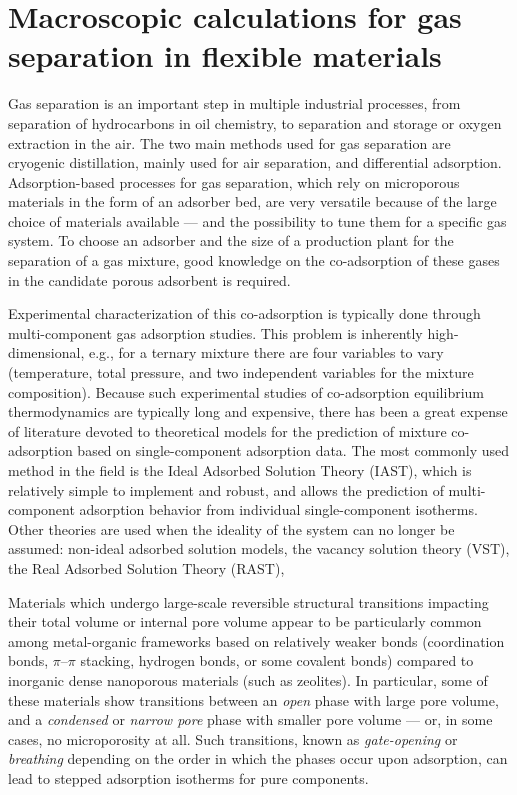\documentclass[thesis]{subfiles}
\begin{document}
\newpage
\section{Macroscopic calculations for gas separation in flexible materials}

Gas separation is an important step in multiple industrial processes, from
separation of hydrocarbons in oil chemistry, to  separation and storage
or oxygen extraction in the air. The two main methods used for gas separation
are cryogenic distillation, mainly used for air separation, and differential
adsorption. Adsorption-based processes for gas separation, which rely on
microporous materials in the form of an adsorber bed, are very versatile because
of the large choice of materials available --- and the possibility to tune them
for a specific gas system. To choose an adsorber and the size of a production
plant for the separation of a gas mixture, good knowledge on the co-adsorption
of these gases in the candidate porous adsorbent is required.

Experimental characterization of this co-adsorption is typically done through
multi-component gas adsorption studies. This problem is inherently
high-dimensional, e.g., for a ternary mixture there are four variables to vary
(temperature, total pressure, and two independent variables for the mixture
composition). Because such experimental studies of co-adsorption equilibrium
thermodynamics are typically long and expensive, there has been a great expense
of literature devoted to theoretical models for the prediction of mixture
co-adsorption based on single-component adsorption data. The most commonly used
method in the field is the Ideal Adsorbed Solution Theory
(IAST)\cite{Myers1965}, which is relatively simple to implement and robust, and
allows the prediction of multi-component adsorption behavior from individual
single-component isotherms. Other theories are used when the ideality of the
system can no longer be assumed: non-ideal adsorbed solution
models\cite{Yang1987, Sweatman2002}, the vacancy solution theory
(VST)\cite{Suwanayuen1980}, the Real Adsorbed Solution Theory\cite{Talu1986}
(RAST), \etc

Materials which undergo large-scale reversible structural transitions impacting
their total volume or internal pore volume appear to be particularly common among
metal-organic frameworks based on relatively weaker bonds (coordination bonds,
$\pi$--$\pi$ stacking, hydrogen bonds, or some covalent bonds) compared to
inorganic dense nanoporous materials (such as zeolites). In particular, some of
these materials show transitions between an \emph{open} phase with large pore
volume, and a \emph{condensed} or \emph{narrow pore} phase with smaller pore
volume --- or, in some cases, no microporosity at all. Such transitions, known
as \emph{gate-opening}\cite{Kitaura2003, Tanaka2008, Li2015} or
\emph{breathing}\cite{Serre2002} depending on the order in which the phases
occur upon adsorption, can lead to stepped adsorption isotherms for pure
components.
\end{document}
